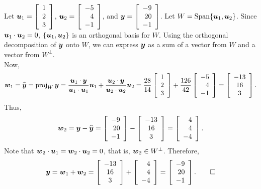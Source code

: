 \begin{Exam}\label{exam:4.5orthoproject2dim} Let $\bb u_1 = \vr{1\\2\\3}$, $\bb u_2 = \vr{-5\\4\\-1}$, and $\bb y = \vr{-9\\20\\-1}$. Let $W = \Span\{\bb u_1, \bb u_2\}$. Since $\bb u_1 \cdot \bb u_2 = 0$, $\{\bb u_1, \bb u_2\}$ is an orthogonal basis for $W$. Using the orthogonal decomposition of $\bb y$ onto $W$, we can express $\bb y$ as a sum of a vector from $W$ and a vector from $W^\perp$.\\

Now, 
\[\bb w_1 = \widehat{\bb y} = \proj_W \bb y = \dfrac{\bb u_1 \cdot \bb y}{\bb u_1\cdot \bb u_1}\bb u_1+\dfrac{\bb u_2 \cdot \bb y}{\bb u_2\cdot \bb u_2}\bb u_2 = \dfrac{28}{14}\vr{1\\2\\3} + \dfrac{126}{42}\vr{-5\\4\\-1} = \mtx{c}{-13\\16\\3}.\]
Thus, \[\bb w_2 = \bb y - \widehat{\bb y} = \vr{-9\\20\\-1} - \mtx{c}{-13\\16\\3} = \vr{4\\4\\-4}.\] Note that $\bb w_2 \cdot \bb u _1 = \bb w_2 \cdot \bb u_2 = 0$, that is, $\bb w_2 \in W^\perp$. Therefore, 
\[\bb y = \bb w_1 + \bb w_2 =  \mtx{c}{-13\\16\\3} + \vr{4\\4\\-4} = \vr{-9\\20\\-1}.\qedhere\]
\end{Exam}\vs

